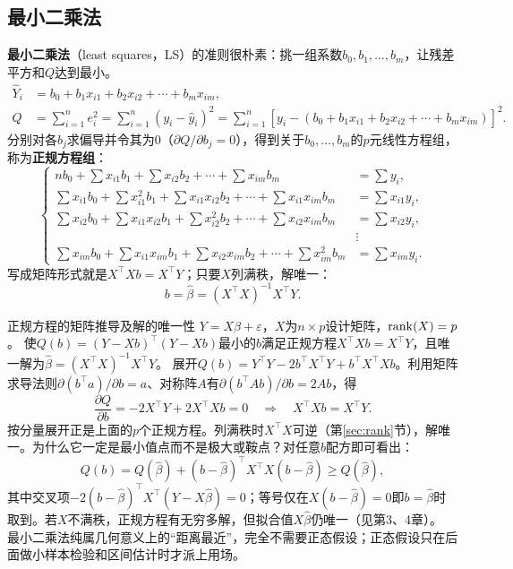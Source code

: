 \subsection{最小二乘法}\label{sec:ls}
\textbf{最小二乘法}（least squares，LS）的准则很朴素：挑一组系数$b_0,b_1,\ldots,b_m$，让残差平方和$Q$达到最小。
\begin{align*}
\widehat Y_i&=b_0+b_1x_{i1}+b_2x_{i2}+\cdots+b_mx_{im},\\
Q&=\sum_{i=1}^{n}e_i^2=\sum_{i=1}^{n}(y_i-\widehat y_i)^2
=\sum_{i=1}^{n}\left[y_i-(b_0+b_1x_{i1}+b_2x_{i2}+\cdots+b_mx_{im})\right]^2.
\end{align*}
分别对各$b_j$求偏导并令其为0（$\partial Q/\partial b_j=0$），得到关于$b_0,\ldots,b_m$的$p$元线性方程组，称为\textbf{正规方程组}：
\[
\left\{\begin{aligned}
nb_0+\sum x_{i1}b_1+\sum x_{i2}b_2+\cdots+\sum x_{im}b_m&=\sum y_i,\\
\sum x_{i1}b_0+\sum x_{i1}^2b_1+\sum x_{i1}x_{i2}b_2+\cdots+\sum x_{i1}x_{im}b_m&=\sum x_{i1}y_i,\\
\sum x_{i2}b_0+\sum x_{i1}x_{i2}b_1+\sum x_{i2}^2b_2+\cdots+\sum x_{i2}x_{im}b_m&=\sum x_{i2}y_i,\\
&\vdots\\
\sum x_{im}b_0+\sum x_{i1}x_{im}b_1+\sum x_{i2}x_{im}b_2+\cdots+\sum x_{im}^2b_m&=\sum x_{im}y_i.
\end{aligned}\right.
\]
写成矩阵形式就是$X^\top Xb=X^\top Y$；只要$X$列满秩，解唯一：
\[
b=\widehat\beta=(X^\top X)^{-1}X^\top Y.
\]
\begin{derivation}{正规方程的矩阵推导及解的唯一性}
$Y=X\beta+\varepsilon$，$X$为$n\times p$设计矩阵，$\operatorname{rank}(X)=p$。
使$Q(b)=(Y-Xb)^\top(Y-Xb)$最小的$b$满足正规方程$X^\top Xb=X^\top Y$，且唯一解为$\widehat\beta=(X^\top X)^{-1}X^\top Y$。
展开$Q(b)=Y^\top Y-2b^\top X^\top Y+b^\top X^\top Xb$。利用矩阵求导法则$\partial(b^\top a)/\partial b=a$、对称阵$A$有$\partial(b^\top Ab)/\partial b=2Ab$，得
\[
\frac{\partial Q}{\partial b}=-2X^\top Y+2X^\top Xb=0
\quad\Longrightarrow\quad X^\top Xb=X^\top Y .
\]
按分量展开正是上面的$p$个正规方程。列满秩时$X^\top X$可逆（第\ref{sec:rank}节），解唯一。为什么它一定是最小值点而不是极大或鞍点？对任意$b$配方即可看出：
\[
Q(b)=Q(\widehat\beta)+(b-\widehat\beta)^\top X^\top X(b-\widehat\beta)\ge Q(\widehat\beta),
\]
其中交叉项$-2(b-\widehat\beta)^\top X^\top(Y-X\widehat\beta)=0$；等号仅在$X(b-\widehat\beta)=0$即$b=\widehat\beta$时取到。若$X$不满秩，正规方程有无穷多解，但拟合值$X\widehat\beta$仍唯一（见第3、4章）。
最小二乘法纯属几何意义上的“距离最近”，完全不需要正态假设；正态假设只在后面做小样本检验和区间估计时才派上用场。
\end{derivation}

